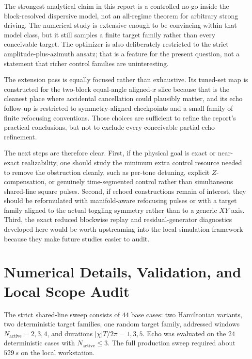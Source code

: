 \documentclass[aps,pra,twocolumn,reprint,floatfix,amsmath,amssymb]{revtex4-2}
\begin{document}
The strongest analytical claim in this report is a controlled no-go inside the block-resolved dispersive model, not an all-regime theorem for arbitrary strong driving. The numerical study is extensive enough to be convincing within that model class, but it still samples a finite target family rather than every conceivable target. The optimizer is also deliberately restricted to the strict amplitude-plus-azimuth ansatz; that is a feature for the present question, not a statement that richer control families are uninteresting.

The extension pass is equally focused rather than exhaustive. Its tuned-set map is constructed for the two-block equal-angle aligned-\(x\) slice because that is the cleanest place where accidental cancellation could plausibly matter, and its echo follow-up is restricted to symmetry-aligned checkpoints and a small family of finite refocusing conventions. Those choices are sufficient to refine the report's practical conclusions, but not to exclude every conceivable partial-echo refinement.

The next steps are therefore clear. First, if the physical goal is exact or near-exact realizability, one should study the minimum extra control resource needed to remove the obstruction cleanly, such as per-tone detuning, explicit \(Z\)-compensation, or genuinely time-segmented control rather than simultaneous shared-line square pulses. Second, if echoed constructions remain of interest, they should be reformulated with manifold-aware refocusing pulses or with a target family aligned to the actual toggling symmetry rather than to a generic \(XY\) axis. Third, the exact reduced blockwise replay and residual-generator diagnostics developed here would be worth upstreaming into the local simulation framework because they make future studies easier to audit.

\appendix

\section{Numerical Details, Validation, and Local Scope Audit}
\label{app:validation}

The strict shared-line sweep consists of \(44\) base cases: two Hamiltonian variants, two deterministic target families, one random target family, addressed windows \(N_{\mathrm{active}}=2,3,4\), and durations \(|\chi|T/2\pi=1,3,5\). Echo was evaluated on the \(24\) deterministic cases with \(N_{\mathrm{active}}\le 3\). The full production sweep required about \(\SI{529}{s}\) on the local workstation.
\end{document}
